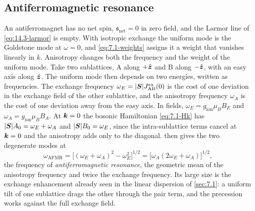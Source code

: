 \subsection{Antiferromagnetic resonance}\label{sec:14.3-afmr}

An antiferromagnet has no net spin, $\mathfrak{s}_{\mathrm{net}} = 0$ in zero field, and the Larmor line of \cref{eq:14.3-larmor} is empty. With isotropic exchange the uniform mode is the Goldstone mode at $\omega = 0$, and \cref{eq:7.1-weights} assigns it a weight that vanishes linearly in $k$. Anisotropy changes both the frequency and the weight of the uniform mode. Take two sublattices, A along $+\hat{\bm{z}}$ and B along $-\hat{\bm{z}}$, with an easy axis along $\hat{\bm{z}}$. The uniform mode then depends on two energies, written as frequencies. The exchange frequency $\omega_E = |\bm{S}|J^{\mathrm{ex}}_{\mathrm{AB}}(0)$ is the cost of one deviation in the exchange field of the other sublattice, and the anisotropy frequency $\omega_A$ is the cost of one deviation away from the easy axis. In fields, $\omega_E = g_{\mathrm{ion}}\mu_BB_E$ and $\omega_A = g_{\mathrm{ion}}\mu_BB_A$. At $\bm{k} = 0$ the bosonic Hamiltonian \cref{eq:7.1-Hk} has $|\bm{S}|A_0 = \omega_E + \omega_A$ and $|\bm{S}|B_0 = \omega_E$, since the intra-sublattice terms cancel at $\bm{k} = 0$ and the anisotropy adds only to the diagonal.  then gives the two degenerate modes at
\begin{equation}
  \omega_{\mathrm{AFMR}} = \bigl[(\omega_E + \omega_A)^2 - \omega_E^2\bigr]^{1/2} = \bigl[\omega_A(2\omega_E + \omega_A)\bigr]^{1/2} ,
  \label{eq:14.3-afmr}
\end{equation}
the frequency of \emph{antiferromagnetic resonance}, the geometric mean of the anisotropy frequency and twice the exchange frequency. Its large size is the exchange enhancement already seen in the linear dispersion of \cref{sec:7.1}: a uniform tilt of one sublattice drags the other through the pair term, and the precession works against the full exchange field.

